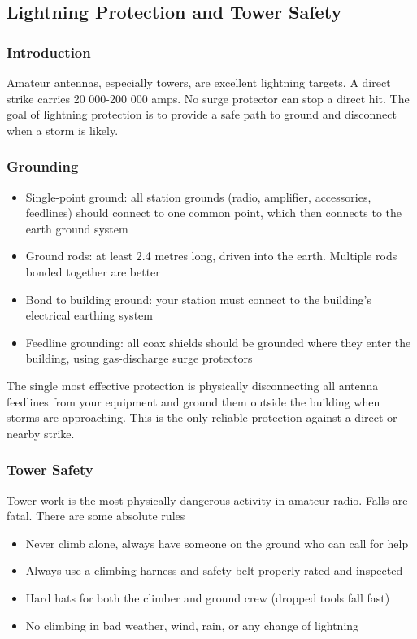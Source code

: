 \documentclass{article}
\begin{document}
\subsection{Lightning Protection and Tower Safety}
\subsubsection{Introduction}
Amateur antennas, especially towers, are excellent lightning targets. A direct strike carries 20 000-200 000 amps. No surge protector can stop a direct hit. The goal of lightning protection is to provide a safe path to ground and disconnect when a storm is likely.

\subsubsection{Grounding}
\begin{itemize}
    \item Single-point ground: all station grounds (radio, amplifier, accessories, feedlines) should connect to one common point, which then connects to the earth ground system
    \item Ground rods: at least 2.4 metres long, driven into the earth. Multiple rods bonded together are better
    \item Bond to building ground: your station must connect to the building's electrical earthing system
    \item Feedline grounding: all coax shields should be grounded where they enter the building, using gas-discharge surge protectors
\end{itemize}
The single most effective protection is physically disconnecting all antenna feedlines from your equipment and ground them outside the building when storms are approaching. This is the only reliable protection against a direct or nearby strike.

\subsubsection{Tower Safety}
Tower work is the most physically dangerous activity in amateur radio. Falls are fatal. There are some absolute rules
\begin{itemize}
    \item Never climb alone, always have someone on the ground who can call for help
    \item Always use a climbing harness and safety belt properly rated and inspected
    \item Hard hats for both the climber and ground crew (dropped tools fall fast)
    \item No climbing in bad weather, wind, rain, or any change of lightning
\end{itemize}
\end{document}
